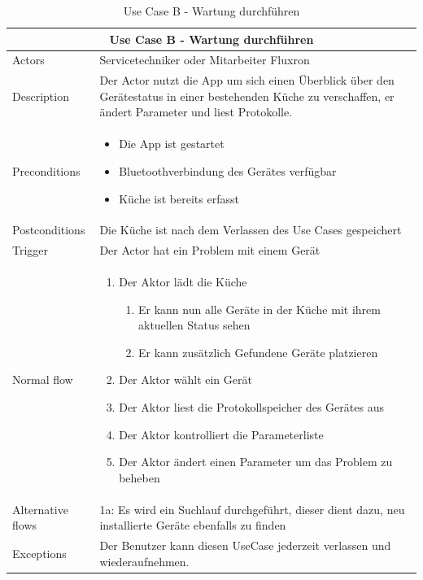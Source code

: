 \begin{table}[H]
\begin{tabular}{|p{3cm}|p{10cm}|}
  \hline
  \multicolumn{2}{|c|}{Use Case B - Wartung durchführen}
  \\\hline
  	Actors
  &
  	Servicetechniker oder Mitarbeiter Fluxron
  \\\hline
  	Description 
  &
  	Der Actor nutzt die App um sich einen Überblick über den Gerätestatus in einer bestehenden Küche zu verschaffen, er ändert Parameter und liest Protokolle.
  \\\hline
  	Preconditions 
  & 
  	\begin{itemize}
	  \item Die App ist gestartet
	  \item Bluetoothverbindung des Gerätes verfügbar
	  \item Küche ist bereits erfasst
  	\end{itemize}
  \\\hline
  	Postconditions
  &
    Die Küche ist nach dem Verlassen des Use Cases gespeichert
  \\\hline
  	Trigger
  &
    Der Actor hat ein Problem mit einem Gerät
  \\\hline
  	Normal flow
  &
	\begin{enumerate}
	  \item Der Aktor lädt die Küche
      \begin{enumerate}
    	\item Er kann nun alle Geräte in der Küche mit ihrem aktuellen Status sehen
	    \item Er kann zusätzlich Gefundene Geräte platzieren
	  \end{enumerate}
	  \item Der Aktor wählt ein Gerät
      \item Der Aktor liest die Protokollspeicher des Gerätes aus
      \item Der Aktor kontrolliert die Parameterliste
      \item Der Aktor ändert einen Parameter um das Problem zu beheben
	\end{enumerate}
  \\\hline
    Alternative flows
  &
  1a: Es wird ein Suchlauf durchgeführt, dieser dient dazu, neu installierte Geräte ebenfalls zu finden
  \\\hline
    Exceptions
  &
    Der Benutzer kann diesen UseCase jederzeit verlassen und wiederaufnehmen.
  \\\hline
\end{tabular}
\caption{Use Case B - Wartung durchführen}
\end{table}

